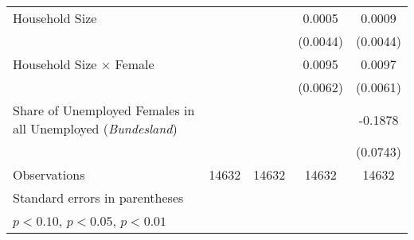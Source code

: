 {\begin{tabular}{l*{4}{c}}
Household Size      &                     &                     &      0.0005         &      0.0009         \\
                    &                     &                     &    (0.0044)         &    (0.0044)         \\
\addlinespace
Household Size $\times$ Female&                     &                     &      0.0095         &      0.0097         \\
                    &                     &                     &    (0.0062)         &    (0.0061)         \\
\addlinespace
Share of Unemployed Females in all Unemployed (\emph{Bundesland})&                     &                     &                     &     -0.1878\sym{**} \\
                    &                     &                     &                     &    (0.0743)         \\
\midrule
Observations        &       14632         &       14632         &       14632         &       14632         \\
\bottomrule
\multicolumn{5}{l}{\footnotesize Standard errors in parentheses}\\
\multicolumn{5}{l}{\footnotesize \sym{*} \(p<0.10\), \sym{**} \(p<0.05\), \sym{***} \(p<0.01\)}\\
\end{tabular}
}
